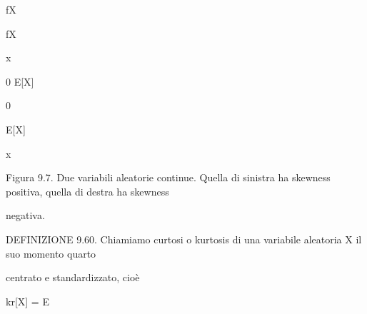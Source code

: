 \documentclass[a4paper,portrait,12pt]{article}
\begin{document}
\begin{flushleft}
fX
\end{flushleft}





\begin{flushleft}
fX
\end{flushleft}





\begin{flushleft}
x
\end{flushleft}





\begin{flushleft}
0 E[X]
\end{flushleft}





0





\begin{flushleft}
E[X]
\end{flushleft}





\begin{flushleft}
x
\end{flushleft}





\begin{flushleft}
Figura 9.7. Due variabili aleatorie continue. Quella di sinistra ha skewness positiva, quella di destra ha skewness
\end{flushleft}


\begin{flushleft}
negativa.
\end{flushleft}





\begin{flushleft}
DEFINIZIONE 9.60. Chiamiamo curtosi o kurtosis di una variabile aleatoria X il suo momento quarto
\end{flushleft}


\begin{flushleft}
centrato e standardizzato, cio\`{e}
\end{flushleft}


\begin{flushleft}
kr[X] = E
\end{flushleft}
\end{document}
